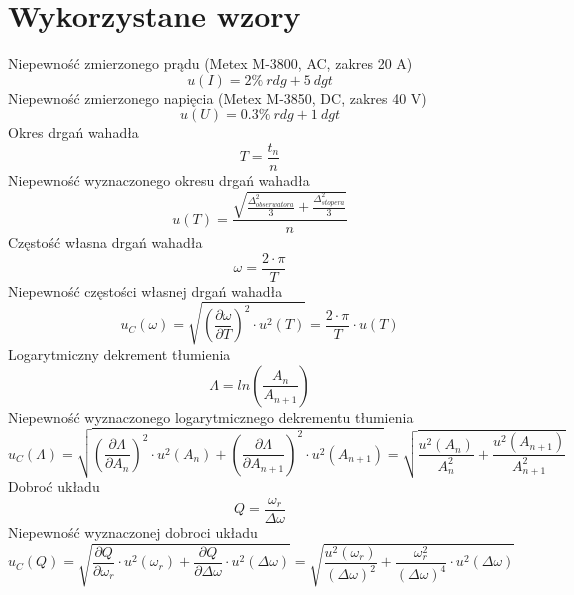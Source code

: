 \documentclass[12pt, a4paper, oneside]{article}
\begin{document}
\section{Wykorzystane wzory}
Niepewność zmierzonego prądu (Metex M-3800, AC, zakres 20 A)
\begin{equation}
u(I)=2\%~ rdg + 5~ dgt
\end{equation}
Niepewność zmierzonego napięcia (Metex M-3850, DC, zakres 40 V)
\begin{equation}
u(U)=0.3\%~ rdg + 1~ dgt
\end{equation}
Okres drgań wahadła
\begin{equation}
T=\frac{t_n}{n}
\end{equation}
Niepewność wyznaczonego okresu drgań wahadła
\begin{equation}
u(T)=\frac{\sqrt{\frac{\Delta^2_{obserwatora}}{3} + \frac{\Delta^2_{stopera}}{3}}}{n}
\end{equation}
Częstość własna drgań wahadła
\begin{equation}
\omega = \frac{2\cdot \pi}{T}
\end{equation}
Niepewność częstości własnej drgań wahadła
\begin{equation}
u_C(\omega)=\sqrt{(\frac{\partial \omega}{\partial T})^2 \cdot u^2(T)} = \frac{2\cdot\pi}{T}\cdot u(T)
\end{equation}
Logarytmiczny dekrement tłumienia
\begin{equation}
\Lambda=ln(\frac{A_n}{A_{n+1}})
\end{equation}
Niepewność wyznaczonego logarytmicznego dekrementu tłumienia
\begin{equation}
u_C(\Lambda)=\sqrt{(\frac{\partial \Lambda}{\partial A_n})^2\cdot u^2(A_n) + (\frac{\partial \Lambda}{\partial A_{n+1}})^2\cdot u^2(A_{n+1})}=\sqrt{\frac{u^2(A_n)}{A_n^2}+\frac{u^2(A_{n+1})}{A_{n+1}^2}}
\end{equation}
Dobroć układu
\begin{equation}
Q=\frac{\omega_r}{\Delta\omega}
\end{equation}
Niepewność wyznaczonej dobroci układu
\begin{equation}
u_C(Q)=\sqrt{\frac{\partial Q}{\partial\omega_r}\cdot u^2(\omega_r) + \frac{\partial Q}{\partial\Delta\omega}\cdot u^2(\Delta\omega)}=\sqrt{\frac{u^2(\omega_r)}{(\Delta\omega)^2}+\frac{\omega^2_r}{(\Delta\omega)^4}\cdot u^2(\Delta\omega)}
\end{equation}
\clearpage
\end{document}
